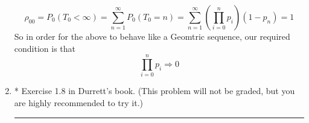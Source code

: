 \documentclass{article} %
\theoremstyle{plain}
\theoremstyle{case}
\begin{document}
\begin{enumerate}[label={\fbox{\textbf{Exercise \#\arabic* :}}}]
  \[
    \rho_{00} = P_0(T_0 < \infty) = \sum^{\infty}_{n=1} P_0(T_0=n)
    = \sum^{\infty}_{n=1} \left( \prod_{i=0}^{n} p_{i}\right) (1 - p_n) = 1
  \]
  So in order for the above to behave like a Geomtric sequence, our
  required condition is that
  \[
      \prod_{i=0}^{n} p_{i} \Longrightarrow 0
  \]
\newpage

  \item * Exercise 1.8 in Durrett's book. (This problem will not be graded, but you are highly recommended to try it.)
\par\noindent\rule{\textwidth}{0.1pt}

\end{enumerate}

%
%
\end{document}

